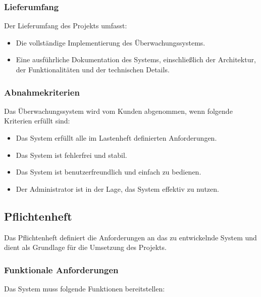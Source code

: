 		\subsubsection{Lieferumfang}

		Der Lieferumfang des Projekts umfasst:

		\begin{itemize}
		\item Die vollständige Implementierung des Überwachungssystems.
		\item Eine ausführliche Dokumentation des Systems, einschließlich der Architektur, der Funktionalitäten und der technischen Details.
		\end{itemize}

		\subsubsection{Abnahmekriterien}

		Das Überwachungssystem wird vom Kunden abgenommen, wenn folgende Kriterien erfüllt sind:

		\begin{itemize}
		\item Das System erfüllt alle im Lastenheft definierten Anforderungen.
		\item Das System ist fehlerfrei und stabil.
		\item Das System ist benutzerfreundlich und einfach zu bedienen.
		\item Der Administrator ist in der Lage, das System effektiv zu nutzen.
		\end{itemize}


\clearpage




\subsection{Pflichtenheft}\label{appendix:a2}\par
Das Pflichtenheft definiert die Anforderungen an das zu entwickelnde System und dient als Grundlage für die Umsetzung des Projekts.

\subsubsection{Funktionale Anforderungen}

Das System muss folgende Funktionen bereitstellen:

